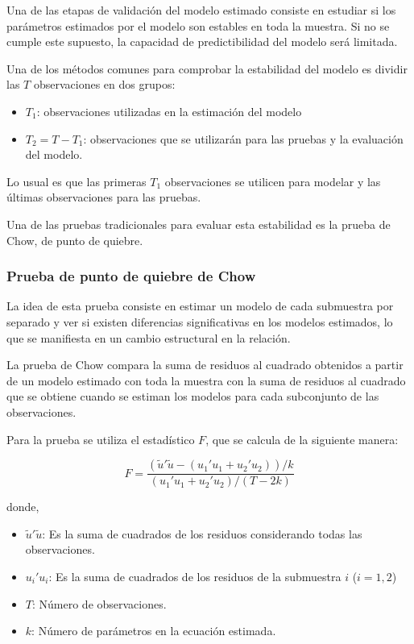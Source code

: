Una de las etapas de validaci\'{o}n del modelo estimado consiste en estudiar si los par\'{a}metros estimados por el modelo son estables en toda la muestra. Si no se cumple este supuesto, la capacidad de predictibilidad del modelo ser\'{a} limitada.\newline

Una de los m\'{e}todos comunes para comprobar la estabilidad del modelo es dividir las $T$ observaciones en dos grupos:

\begin{itemize}
\item $T_{1}$: observaciones utilizadas en la estimaci\'{o}n del modelo
\item $T_{2}=T-T_{1}$: observaciones que se utilizar\'{a}n para las pruebas y la evaluaci\'{o}n del modelo.
\end{itemize}

Lo usual es que las primeras $T_{1}$ observaciones se utilicen para modelar y las \'{u}ltimas observaciones para las pruebas.\newline

Una de las pruebas tradicionales para evaluar esta estabilidad es la prueba de Chow, de punto de quiebre.

\subsubsection*{Prueba de punto de quiebre de Chow}

La idea de esta prueba consiste en estimar un modelo de cada submuestra por separado y ver si existen diferencias significativas en los modelos estimados, lo que se manifiesta en un cambio estructural en la relaci\'{o}n.\newline

La prueba de Chow compara la suma de residuos al cuadrado obtenidos a partir de un modelo estimado con toda la muestra con la suma de residuos al cuadrado que se obtiene cuando se estiman los modelos para cada subconjunto de las observaciones.\newline

Para la prueba se utiliza el estad\'{i}stico $F$, que se calcula de la siguiente manera:

\[
F=\frac{\left( \tilde{u}'\tilde{u}-(u_{1}'u_{1}+u_{2}'u_{2}) \right)/k}{(u_{1}'u_{1}+u_{2}'u_{2})/(T-2k)}
\]

donde,
\begin{itemize}
 \item $\tilde{u}'\tilde{u}$: Es la suma de cuadrados de los residuos considerando todas las observaciones.
 \item $u_{i}'u_{i}$: Es la suma de cuadrados de los residuos de la submuestra $i$  ($i=1,  2$)
 \item $T$: N\'{u}mero de observaciones.
 \item $k$: N\'{u}mero de par\'{a}metros en la ecuaci\'{o}n estimada.
\end{itemize}


